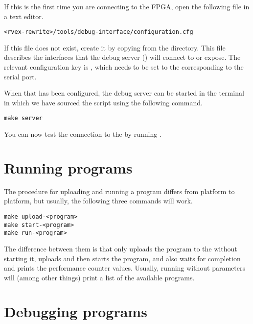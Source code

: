 If this is the first time you are connecting to the FPGA, open the following 
file in a text editor.

\begin{lstlisting}[numbers=none, language=nothing]
<rvex-rewrite>/tools/debug-interface/configuration.cfg
\end{lstlisting}

\noindent If this file does not exist, create it by copying 
 from the  directory. This file 
describes the interfaces that the debug server () will connect to or 
expose. The relevant configuration key is , which needs to be
set to the  corresponding to the serial port.

When that has been configured, the debug server can be started in the terminal
in which we have sourced the  script using the following command.

\begin{lstlisting}[numbers=none, language=nothing]
make server
\end{lstlisting}

\noindent You can now test the connection to the \rvex{} by running
.

\section{Running programs}
\label{sec:rvd-run}

The procedure for uploading and running a program differs from platform to
platform, but usually, the following three commands will work.

\begin{lstlisting}[numbers=none, language=nothing]
make upload-<program>
make start-<program>
make run-<program>
\end{lstlisting}

\noindent The difference between them is that  only uploads the 
program to the \rvex{} without starting it,  uploads and then starts 
the program, and  also waits for completion and prints the performance 
counter values. Usually, running  without parameters will (among 
other things) print a list of the available programs.

\section{Debugging programs}
\label{sec:rvd-debug}

